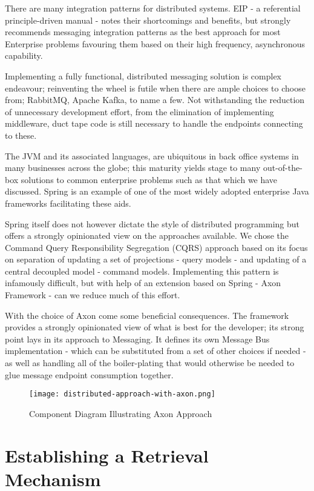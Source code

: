 There are many integration patterns for distributed systems. EIP - a referential principle-driven manual - notes their shortcomings and benefits, but strongly recommends messaging integration patterns as the best approach for most Enterprise problems favouring them based on their high frequency, asynchronous capability.

Implementing a fully functional, distributed messaging solution is complex endeavour; reinventing the wheel is futile when there are ample choices to choose from; RabbitMQ, Apache Kafka, to name a few. Not withstanding the reduction of unnecessary development effort, from the elimination of implementing middleware, duct tape code is still necessary to handle the endpoints connecting to these.

The JVM and its associated languages, are ubiquitous in back office systems in many businesses across the globe; this maturity yields stage to many out-of-the-box solutions to common enterprise problems such as that which we have discussed. Spring is an example of one of the most widely adopted enterprise Java frameworks facilitating these aids.

Spring itself does not however dictate the style of distributed programming but offers a strongly opinionated view on the approaches available. We chose the Command Query Responsibility Segregation (CQRS) approach based on its focus on separation of updating a set of projections - query models - and updating of a central decoupled model - command models. Implementing this pattern is infamously difficult, but with help of an extension based on Spring - Axon Framework - can we reduce much of this effort.  

With the choice of Axon come some beneficial consequences. The framework provides a strongly opinionated view of what is best for the developer; its strong point lays in its approach to Messaging. It defines its own Message Bus implementation - which can be substituted from a set of other choices if needed - as well as handling all of the boiler-plating that would otherwise be needed to glue message endpoint consumption together.

\begin{figure}[h!]
	\centering
	\texttt{[image: distributed-approach-with-axon.png]}
	\caption{Component Diagram Illustrating Axon Approach}
	\label{fig:distributed-approach}
\end{figure}

\section{Establishing a Retrieval Mechanism}

